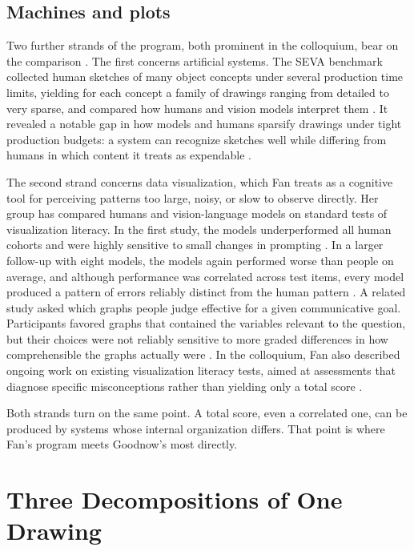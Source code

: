 \documentclass[11pt]{article}
\theoremstyle{remark}
\begin{document}
\subsection{Machines and plots}

Two further strands of the program, both prominent in the colloquium, bear on the comparison \cite{fancolloquium}. The first concerns artificial systems. The SEVA benchmark collected human sketches of many object concepts under several production time limits, yielding for each concept a family of drawings ranging from detailed to very sparse, and compared how humans and vision models interpret them \cite{mukherjee2023seva}. It revealed a notable gap in how models and humans sparsify drawings under tight production budgets: a system can recognize sketches well while differing from humans in which content it treats as expendable \cite{mukherjee2023seva,vinker2022clipasso}.

The second strand concerns data visualization, which Fan treats as a cognitive tool for perceiving patterns too large, noisy, or slow to observe directly. Her group has compared humans and vision-language models on standard tests of visualization literacy. In the first study, the models underperformed all human cohorts and were highly sensitive to small changes in prompting \cite{verma2024}. In a larger follow-up with eight models, the models again performed worse than people on average, and although performance was correlated across test items, every model produced a pattern of errors reliably distinct from the human pattern \cite{verma2025}. A related study asked which graphs people judge effective for a given communicative goal. Participants favored graphs that contained the variables relevant to the question, but their choices were not reliably sensitive to more graded differences in how comprehensible the graphs actually were \cite{huey2023plots}. In the colloquium, Fan also described ongoing work on existing visualization literacy tests, aimed at assessments that diagnose specific misconceptions rather than yielding only a total score \cite{fancolloquium}.

Both strands turn on the same point. A total score, even a correlated one, can be produced by systems whose internal organization differs. That point is where Fan's program meets Goodnow's most directly.

\section{Three Decompositions of One Drawing}
\label{sec:decomp}
\end{document}
